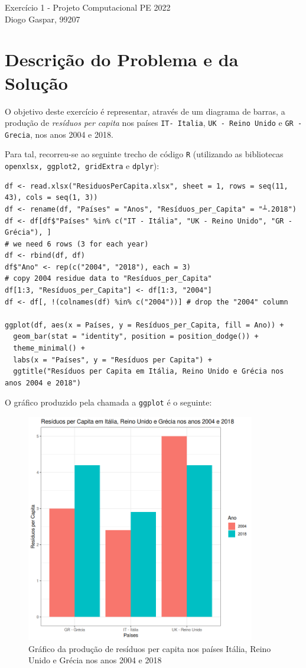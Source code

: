 \documentclass[11pt]{article}
\newcommand{\gaspar}{Diogo Gaspar, 99207}
\begin{document}
\begin{center}
{\huge{Exercício 1 - Projeto Computacional PE 2022}} \\
\vspace{1.5mm}
{\large{\gaspar}} \\
\end{center}

\section{Descrição do Problema e da Solução}
O objetivo deste exercício é representar, através de um diagrama de barras, a produção de \textit{resíduos per capita} nos países \texttt{IT- Italia}, \texttt{UK - Reino Unido} e \texttt{GR - Grecia}, nos anos 2004 e 2018.

\vspace{0.5mm}
Para tal, recorreu-se ao seguinte trecho de código \texttt{R} (utilizando as bibliotecas \texttt{openxlsx, ggplot2, gridExtra} e \texttt{dplyr}):

\begin{lstlisting}
df <- read.xlsx("ResiduosPerCapita.xlsx", sheet = 1, rows = seq(11, 43), cols = seq(1, 3))
df <- rename(df, "Países" = "Anos", "Resíduos_per_Capita" = "┴.2018")
df <- df[df$"Países" %in% c("IT - Itália", "UK - Reino Unido", "GR - Grécia"), ]
# we need 6 rows (3 for each year)
df <- rbind(df, df)
df$"Ano" <- rep(c("2004", "2018"), each = 3)
# copy 2004 residue data to "Resíduos_per_Capita"
df[1:3, "Resíduos_per_Capita"] <- df[1:3, "2004"]
df <- df[, !(colnames(df) %in% c("2004"))] # drop the "2004" column

ggplot(df, aes(x = Países, y = Resíduos_per_Capita, fill = Ano)) + 
  geom_bar(stat = "identity", position = position_dodge()) + 
  theme_minimal() +
  labs(x = "Países", y = "Resíduos per Capita") +
  ggtitle("Resíduos per Capita em Itália, Reino Unido e Grécia nos anos 2004 e 2018")
\end{lstlisting}

O gráfico produzido pela chamada a \texttt{ggplot} é o seguinte:

\begin{figure}
    \centering
    \includegraphics[width=10cm]{../imgs/exercise-1.png}
    \caption{Gráfico da produção de resíduos per capita nos países Itália, Reino Unido e Grécia nos anos 2004 e 2018}
    \label{fig:exercise-1}
\end{figure}
\end{document}
